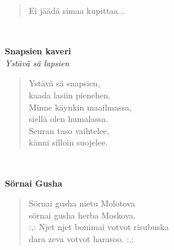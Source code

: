 \noindent\begin{minipage}{\linewidth}
\begin{verse}
	Ei jäädä simaa kupittaa...\\
\end{verse}
\end{minipage}\\[10pt]
%
%
\noindent\begin{minipage}{\linewidth}
\vspace{5pt}
\parbox[t]{0.85\linewidth}{\raggedright {\large\bf Snapsien kaveri}\\[2pt]\small\emph{Ystävä sä lapsien}\\[6pt]}
\begin{verse}
	
	Ystävä sä snapsien,\\
	kaada lasiin pienehen.\\
	Minne käynkin maailmassa,\\
	siellä olen humalassa.\\
	Seuran taso vaihtelee,\\
	känni silloin suojelee.\\
\end{verse}
\end{minipage}\\[10pt]
%
%
\noindent\begin{minipage}{\linewidth}
\vspace{5pt}
\parbox[t]{0.85\linewidth}{\raggedright {\large\bf Sörnai Gusha}\\[6pt]}
\begin{verse}
	Sörnai gusha nietu Molotova\\
	sörnai gusha herba Moskova.\\
	\hspace{0pt-\widthof{:,: }}:,: Njet njet bonimai votvot risubuska\\
	dara zeva votvot harasoo. :,:\\
\end{verse}
\end{minipage}\\[10pt]
